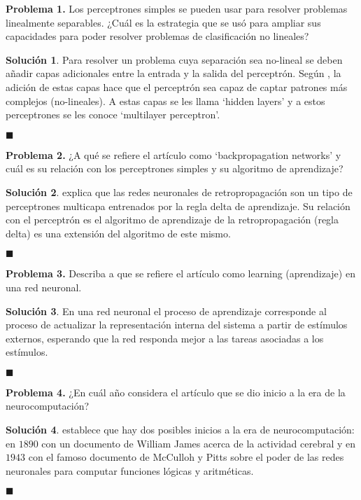 \documentclass[12pt]{article}
\theoremstyle{plain}
\theoremstyle{definition}
\theoremstyle{definition}
\theoremstyle{definition}
\newtheorem*{solution}{Solución}
\begin{document}
\noindent \textbf{Problema 1.} Los perceptrones simples se pueden usar para resolver problemas linealmente separables. ¿Cuál es la estrategia que se usó para ampliar sus capacidades para poder resolver problemas de clasificación no lineales?
\begin{solution}
\noindent Para resolver un problema cuya separación sea no-lineal se deben añadir capas adicionales entre la entrada y la salida del perceptrón. Según \cite{basheer2000artificial}, la adición de estas capas hace que el perceptrón sea capaz de captar patrones más complejos (no-lineales). A estas capas se les llama `hidden layers' y a estos perceptrones se les conoce `multilayer perceptron'.  
\end{solution}
\begin{flushright}
$\blacksquare$
\end{flushright}

\noindent \textbf{Problema 2.} ¿A qué se refiere el artículo como `backpropagation networks' y cuál es su relación con los perceptrones simples y su algoritmo de aprendizaje?
\begin{solution}
\noindent \cite{basheer2000artificial} explica que las redes neuronales de retropropagación son un tipo de perceptrones multicapa entrenados por la regla delta de aprendizaje. Su relación con el perceptrón es el algoritmo de aprendizaje de la retropropagación (regla delta) es una extensión del algoritmo de este mismo. 
\end{solution}
\begin{flushright}
$\blacksquare$
\end{flushright}

\noindent \textbf{Problema 3.} Describa a que se refiere el artículo como learning (aprendizaje) en una red neuronal.

\begin{solution}
En una red neuronal el proceso de aprendizaje corresponde al proceso de actualizar la representación interna del sistema a partir de estímulos externos, esperando que la red responda mejor a las tareas asociadas a los estímulos.
\end{solution}
\begin{flushright}
$\blacksquare$
\end{flushright}

\noindent \textbf{Problema 4.} ¿En cuál año considera el artículo que se dio inicio a la era de la neurocomputación?

\begin{solution}
\cite{basheer2000artificial} establece que hay dos posibles inicios a la era de neurocomputación: en $1890$ con un documento de William James acerca de la actividad cerebral y en $1943$ con el famoso documento de McCulloh y Pitts sobre el poder de las redes neuronales para computar funciones lógicas y aritméticas.
\end{solution}
\begin{flushright}
$\blacksquare$
\end{flushright}
\end{document}
